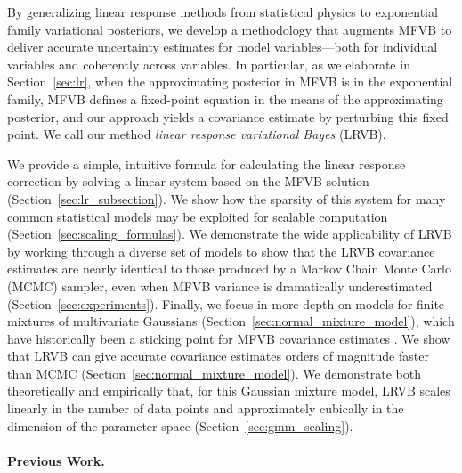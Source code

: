 \documentclass{article}\usepackage[]{graphicx}\usepackage[]{color}
\newcommand{\mysec}[1]{Section~\ref{sec:#1}}
\theoremstyle{plain}
\begin{document}
By generalizing linear response methods from statistical physics
\citep{parisi:1988:statistical, opper:2003:variational, opper:2001:advancedmeanfield, tanaka:2000:information}
to exponential family variational posteriors, we develop a methodology that
augments MFVB to deliver accurate uncertainty estimates for model
variables---both for individual variables and coherently across variables. In
particular, as we elaborate in \mysec{lr}, when the approximating posterior in
MFVB is in the exponential family, MFVB defines a fixed-point equation in the
means of the approximating posterior, and our approach yields a covariance
estimate by perturbing this fixed point. We call our method \emph{linear
response variational Bayes} (LRVB).

We provide a simple, intuitive formula for calculating the linear response
correction by solving a linear system based on the MFVB solution
(\mysec{lr_subsection}). We show how the sparsity of this system for many common
statistical models may be exploited for scalable computation
(\mysec{scaling_formulas}). We demonstrate the wide applicability of LRVB by
working through a diverse set of models to show that the LRVB covariance
estimates are nearly identical to those produced by a Markov Chain Monte Carlo
(MCMC) sampler, even when MFVB variance is dramatically underestimated
(\mysec{experiments}). Finally, we focus in more depth on models for finite
mixtures of multivariate Gaussians (\mysec{normal_mixture_model}), which have
historically been a sticking point for MFVB covariance estimates
\citep{bishop:2006:pattern,turner:2011:two}. We show that LRVB can give accurate
covariance estimates orders of magnitude faster than MCMC
(\mysec{normal_mixture_model}). We demonstrate both theoretically and
empirically that, for this Gaussian mixture model, LRVB scales linearly in the
number of data points and approximately cubically in the dimension of the
parameter space (\mysec{gmm_scaling}).

\paragraph{Previous Work.}
\end{document}

